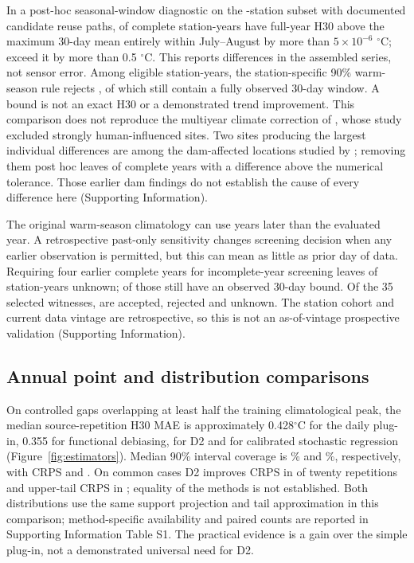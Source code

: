 \documentclass[draft,linenumbers]{agujournal2025}
\begin{document}
In a post-hoc seasonal-window diagnostic on the \SWStations{}-station subset with documented candidate reuse paths, \SWAbove{} of \SWComplete{} complete station-years have full-year H30 above the maximum 30-day mean entirely within July--August by more than $5\times10^{-6}$ $^{\circ}$C; \SWAboveHalf{} exceed it by more than 0.5 $^{\circ}$C. This reports differences in the assembled series, not sensor error. Among \SWRuleYears{} eligible station-years, the station-specific 90\% warm-season rule rejects \SWWarmRejected{}, of which \SWWarmBounds{} still contain a fully observed 30-day window. A bound is not an exact H30 or a demonstrated trend improvement. This comparison does not reproduce the multiyear climate correction of , whose study excluded strongly human-influenced sites. Two sites producing the largest individual differences are among the dam-affected locations studied by ; removing them post hoc leaves \SWExclAbove{} of \SWExclYears{} complete years with a difference above the numerical tolerance. Those earlier dam findings do not establish the cause of every difference here (Supporting Information).

The original warm-season climatology can use years later than the evaluated year. A retrospective past-only sensitivity changes \PWChange{} screening decision when any earlier observation is permitted, but this can mean as little as \PWMinimumDays{} prior day of data. Requiring four earlier complete years for incomplete-year screening leaves \PWUnknown{} of \PWYears{} station-years unknown; \PWUnknownBounds{} of those still have an observed 30-day bound. Of the 35 selected witnesses, \PWWitnessAccepted{} are accepted, \PWWitnessRejected{} rejected and \PWWitnessUnknown{} unknown. The station cohort and current data vintage are retrospective, so this is not an as-of-vintage prospective validation (Supporting Information).



\subsection{Annual point and distribution comparisons}
On controlled gaps overlapping at least half the training climatological peak, the median source-repetition H30 MAE is approximately 0.428$^{\circ}$C for the daily plug-in, 0.355 for functional debiasing, \WADTwoMAE{} for D2 and \WAStochasticMAE{} for calibrated stochastic regression (Figure~\ref{fig:estimators}). Median 90\% interval coverage is \WADTwoCoverage\% and \WAStochasticCoverage\%, respectively, with CRPS \WADTwoCRPS{} and \WAStochasticCRPS{}. On common cases D2 improves CRPS in \WADTwoCRPSWins{} of twenty repetitions and upper-tail CRPS in \WADTwoTailWins{}; equality of the methods is not established. Both distributions use the same support projection and tail approximation in this comparison; method-specific availability and paired counts are reported in Supporting Information Table S1. The practical evidence is a gain over the simple plug-in, not a demonstrated universal need for D2.
\end{document}
